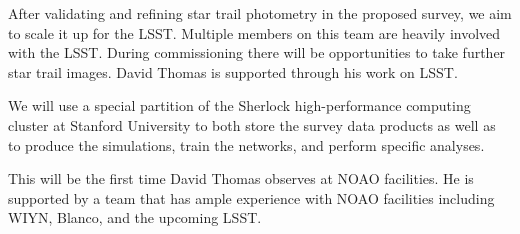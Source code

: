 \documentclass[11pt]{article}
\begin{document}
After validating and refining star trail photometry in the proposed survey, we aim to scale it up for the LSST. Multiple members on this team are heavily involved with the LSST. During commissioning there will be opportunities to take further star trail images. David Thomas is supported through his work on LSST.

We will use a special partition of the Sherlock high-performance computing cluster at Stanford University to both store the survey data products as well as to produce the simulations, train the networks, and perform specific analyses. 

%
%
%
%
%


%

\thepast

This will be the first time David Thomas observes at NOAO facilities. He is supported by a team that has ample experience with NOAO facilities including WIYN, Blanco, and the upcoming LSST. 


%
\end{document}
